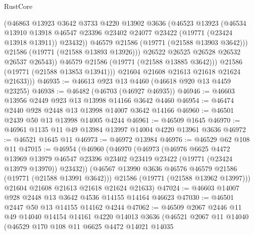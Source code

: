 \begin{lexlean}{RustCore}
\begin{coremodule}
                    (@46863
                      @13923
                      @3642
                      @3733
                      @4220
                      @13902
                      @3636
                      (@46523
                        @13923
                        (@46534
                          @13910
                          @13918
                          @46547
                          @23396
                          @23402
                          @24077
                          @23422
                          (@19771 (@23424 @13918 @13911))
                          @23432))
                      @46579
                      @21586
                      (@19771 (@21588 @13903 @3642)))
                    @21586
                    (@19771 (@21588 @13893 @13926)))
                  @26522
                  @26525
                  @26528
                  @26532
                  @26537
                  @26543))
              @46579
              @21586
              (@19771 (@21588 @13885 @3642)))
            @21586
            (@19771 (@21588 @13853 @13941)))
          @21604
          @21608
          @21613
          @21618
          @21624
          @21633)))
@46935 := @46613 @923 @13 @4460 (@46618 @920 @13 @4459 @23255)
@46938 := @46482 (@46703 (@46927 @46935))
@46946 := @46603 @13956 @2449 @923 @13 @13998 @14166 @3642 @4460
@46954 := @46474 @2440 @928 @2448 @13 @13998 @14007 @3642 @14166
@46960 := @46501 @2439 @50 @13 @13998 @14005 @4244
@46961 := @46509 @1645
@46970 := @46961 @1135 @11 @49 @13984 @13997 @14004 @4220 @13961 @3636
@46972 := @46521 @1645 @11
@46973 := @46972 @13984
@46976 := @46529 @62 @108 @11
@47015 := @46954
    (@46960
      (@46970
        (@46973
          (@46976
            @6625
            @4472
            @13969
            @13979
            @46547
            @23396
            @23402
            @23419
            @23422
            (@19771 (@23424 @13979 @13970))
            @23432))
        (@46567 @13990 @3636 @46576 @46579 @21586 (@19771 (@21588 @13991 @3642)))
        @21586
        (@19771 (@21588 @13962 @13997)))
      @21604
      @21608
      @21613
      @21618
      @21624
      @21633)
@47024 := @46603 @14007 @928 @2448 @13 @3642 @4536 @14155 @14164 @46623
@47030 := @46501 @2447 @50 @13 @14155 @14162 @4244
@47062 := @46509
    @2067
    @2446
    @11
    @49
    @14040
    @14154
    @14161
    @4220
    @14013
    @3636
    (@46521
      @2067
      @11
      @14040
      (@46529
        @170
        @108
        @11
        @6625
        @4472
        @14021
        @14035

\end{coremodule}
\end{lexlean}
